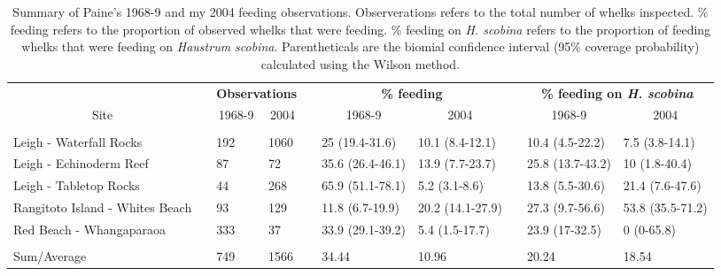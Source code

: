 \begin{table}[!tbp]
\caption{Summary of Paine's 1968-9 and my 2004 feeding observations.  Observerations refers to the total number of whelks inspected. \% feeding refers to the proportion of observed whelks that were feeding. \% feeding on \emph{H. scobina} refers to the proportion of feeding whelks that were feeding on \emph{Haustrum scobina}.  Parentheticals are the biomial confidence interval (95\% coverage probability) calculated using the Wilson method.\label{tab:summ}} 
{\centering
\begin{tabular}{lcllcllcll}
\hline
\multicolumn{1}{c}{\bfseries }&\multicolumn{1}{c}{\bfseries }&\multicolumn{2}{c}{\bfseries Observations}&\multicolumn{1}{c}{\bfseries }&\multicolumn{2}{c}{\bfseries \% feeding}&\multicolumn{1}{c}{\bfseries }&\multicolumn{2}{c}{\bfseries \% feeding on \emph{H. scobina}}\tabularnewline
\cline{3-4} \cline{6-7} \cline{9-10}
\multicolumn{1}{c}{Site}&\multicolumn{1}{c}{}&\multicolumn{1}{c}{1968-9}&\multicolumn{1}{c}{2004}&\multicolumn{1}{c}{}&\multicolumn{1}{c}{1968-9}&\multicolumn{1}{c}{2004}&\multicolumn{1}{c}{}&\multicolumn{1}{c}{1968-9}&\multicolumn{1}{c}{2004}\tabularnewline
\hline
&&&&&&&&&\tabularnewline
Leigh - Waterfall Rocks&&192&1060&&25 (19.4-31.6)&10.1 (8.4-12.1)&&10.4 (4.5-22.2)&7.5 (3.8-14.1)\tabularnewline
Leigh - Echinoderm Reef&&87&72&&35.6 (26.4-46.1)&13.9 (7.7-23.7)&&25.8 (13.7-43.2)&10 (1.8-40.4)\tabularnewline
Leigh - Tabletop Rocks&&44&268&&65.9 (51.1-78.1)&5.2 (3.1-8.6)&&13.8 (5.5-30.6)&21.4 (7.6-47.6)\tabularnewline
Rangitoto Island - Whites Beach&&93&129&&11.8 (6.7-19.9)&20.2 (14.1-27.9)&&27.3 (9.7-56.6)&53.8 (35.5-71.2)\tabularnewline
Red Beach - Whangaparaoa&&333&37&&33.9 (29.1-39.2)&5.4 (1.5-17.7)&&23.9 (17-32.5)&0 (0-65.8)\tabularnewline
\hline
&&&&&&&&&\tabularnewline
Sum/Average&&749&1566&&34.44&10.96&&20.24&18.54\tabularnewline
\hline
\end{tabular}}
\end{table}
